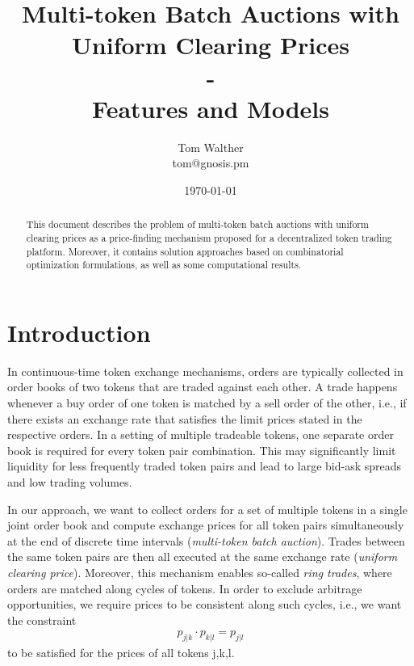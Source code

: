 \documentclass[11pt,parskip=full]{scrartcl}%
\title{
  Multi-token Batch Auctions with Uniform Clearing Prices\\
  - \\
  \Large Features and Models}
\author{Tom Walther \\ tom@gnosis.pm}
\date{\today}
\newcommand*{\ie}{i.e., }
\begin{document}
\maketitle


\begin{abstract}
  This document describes the problem of multi-token batch auctions with uniform clearing prices as
  a price-finding mechanism proposed for a decentralized token trading platform.
  Moreover, it contains solution approaches based on combinatorial optimization formulations, as
  well as some computational results.
\end{abstract}



\tableofcontents

\newpage
\section{Introduction}
\label{sec:introduction}

In continuous-time token exchange mechanisms, orders are typically collected in order books of two
tokens that are traded against each other.
A trade happens whenever a buy order of one token is matched by a sell order of the other, \ie if
there exists an exchange rate that satisfies the limit prices stated in the respective orders.
In a setting of multiple tradeable tokens, one separate order book is required for every token pair
combination.
This may significantly limit liquidity for less frequently traded token pairs and lead to large
bid-ask spreads and low trading volumes.

In our approach, we want to collect orders for a set of multiple tokens in a single joint order
book and compute exchange prices for all token pairs simultaneously at the end of discrete time
intervals (\emph{multi-token batch auction}).
Trades between the same token pairs are then all executed at the same exchange rate (\emph{uniform
clearing price}).
Moreover, this mechanism enables so-called \emph{ring trades}, where orders are matched along
cycles of tokens.
In order to exclude arbitrage opportunities, we require prices to be consistent along such cycles,
\ie we want the constraint
\begin{align}
  p_{j|k} \cdot p_{k|l} = p_{j|l}
  \label{eq:arbitrage_freeness}
\end{align}
to be satisfied for the prices of all tokens j,k,l.
\end{document}
